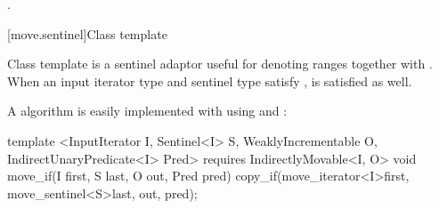 \begin{itemdescr}
\pnum
\returns {}.
\end{itemdescr}







[move.sentinel]{Class template }


\pnum
Class template  is a sentinel adaptor useful for denoting
ranges together with . When an input iterator type
 and sentinel type  satisfy ,
 is satisfied as well.

\pnum
\enterexample A  algorithm is easily implemented with
 using  and :

\begin{codeblock}
template <InputIterator I, Sentinel<I> S, WeaklyIncrementable O,
          IndirectUnaryPredicate<I> Pred>
  requires IndirectlyMovable<I, O>
void move_if(I first, S last, O out, Pred pred)
{
  copy_if(move_iterator<I>{first}, move_sentinel<S>{last}, out, pred);
}
\end{codeblock}

\exitexample

